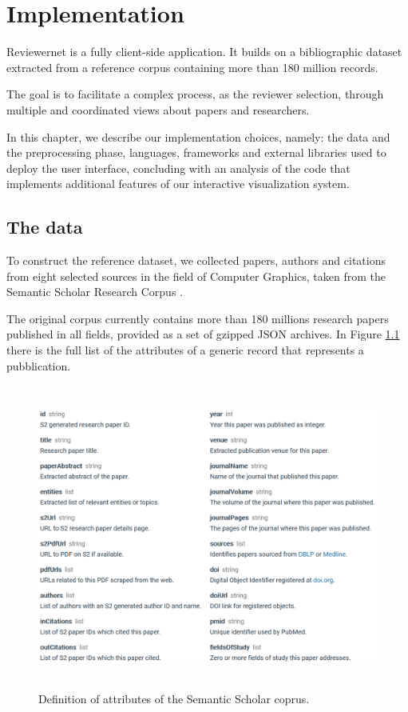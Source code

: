 \chapter{Implementation}
\label{sec:impl}
Reviewernet is a fully client-side application. It builds on a bibliographic dataset extracted from a reference corpus containing more than 180 million records.

The goal is to facilitate a complex process, as the reviewer selection, through multiple and coordinated views about papers and researchers.

In this chapter, we describe our implementation choices, namely: the data and the preprocessing phase, languages, frameworks and external libraries used to deploy the user interface, concluding with an analysis of the code that implements additional features of our interactive visualization system.
\section{The data}
To construct the reference dataset, we collected papers, authors and citations from eight selected sources in the field of Computer Graphics, taken from the Semantic Scholar Research Corpus \cite{ammar:18}. 

The original corpus currently contains more than 180 millions research papers published in all fields, provided as a set of gzipped JSON archives. In Figure \ref{jsonfields} there is the full list of the attributes of a generic record that represents a pubblication.

\begin{figure}[!ht]
    \centering
    \includegraphics[height=10cm]{fig/corpusfields.png}
    \caption{Definition of attributes of the Semantic Scholar coprus.\label{jsonfields}}
\end{figure}

